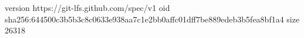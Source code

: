 version https://git-lfs.github.com/spec/v1
oid sha256:644500c3b5b3c8c0633e938aa7c1e2bb0affc01dff7be889edeb3b5fea8bf1a4
size 26318

